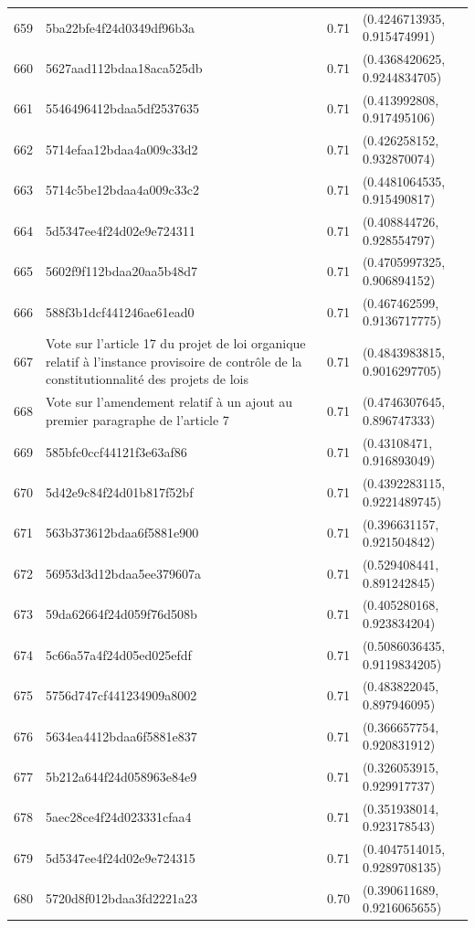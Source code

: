 \begin{table}[ht]
\begin{tabular}{rlrl}
  659 & 5ba22bfe4f24d0349df96b3a & 0.71 & (0.4246713935, 0.915474991) \\ 
  660 & 5627aad112bdaa18aca525db & 0.71 & (0.4368420625, 0.9244834705) \\ 
  661 & 5546496412bdaa5df2537635 & 0.71 & (0.413992808, 0.917495106) \\ 
  662 & 5714efaa12bdaa4a009c33d2 & 0.71 & (0.426258152, 0.932870074) \\ 
  663 & 5714c5be12bdaa4a009c33c2 & 0.71 & (0.4481064535, 0.915490817) \\ 
  664 & 5d5347ee4f24d02e9e724311 & 0.71 & (0.408844726, 0.928554797) \\ 
  665 & 5602f9f112bdaa20aa5b48d7 & 0.71 & (0.4705997325, 0.906894152) \\ 
  666 & 588f3b1dcf441246ae61ead0 & 0.71 & (0.467462599, 0.9136717775) \\ 
  667 & Vote sur l'article 17 du projet de loi organique relatif à l'instance provisoire de contrôle de la constitutionnalité des projets de lois & 0.71 & (0.4843983815, 0.9016297705) \\ 
  668 & Vote sur l'amendement relatif à un ajout au premier paragraphe de l'article 7 & 0.71 & (0.4746307645, 0.896747333) \\ 
  669 & 585bfc0ccf44121f3e63af86 & 0.71 & (0.43108471, 0.916893049) \\ 
  670 & 5d42e9c84f24d01b817f52bf & 0.71 & (0.4392283115, 0.9221489745) \\ 
  671 & 563b373612bdaa6f5881e900 & 0.71 & (0.396631157, 0.921504842) \\ 
  672 & 56953d3d12bdaa5ee379607a & 0.71 & (0.529408441, 0.891242845) \\ 
  673 & 59da62664f24d059f76d508b & 0.71 & (0.405280168, 0.923834204) \\ 
  674 & 5c66a57a4f24d05ed025efdf & 0.71 & (0.5086036435, 0.9119834205) \\ 
  675 & 5756d747cf441234909a8002 & 0.71 & (0.483822045, 0.897946095) \\ 
  676 & 5634ea4412bdaa6f5881e837 & 0.71 & (0.366657754, 0.920831912) \\ 
  677 & 5b212a644f24d058963e84e9 & 0.71 & (0.326053915, 0.929917737) \\ 
  678 & 5aec28ce4f24d023331cfaa4 & 0.71 & (0.351938014, 0.923178543) \\ 
  679 & 5d5347ee4f24d02e9e724315 & 0.71 & (0.4047514015, 0.9289708135) \\ 
  680 & 5720d8f012bdaa3fd2221a23 & 0.70 & (0.390611689, 0.9216065655) \\ 

\end{tabular}
\end{table}
